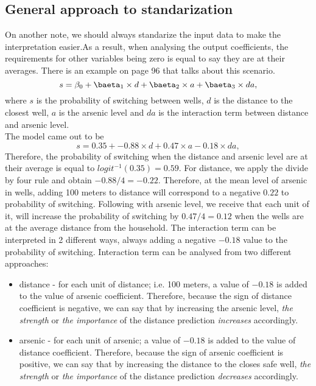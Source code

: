 \documentclass{article}
\begin{document}
\subsection{General approach to standarization}
On another note, we should always standarize the input data to make the interpretation easier.As a result, when analysing the output coefficients, the requirements for other variables being zero is equal to say they are at their averages. There is an example on page 96 that talks about this scenario.
\begin{equation}
s = \beta_0 + \baeta_1 \times d + \baeta_2 \times a + \baeta_3 \times da,
\end{equation}
where $s$ is the probability of switching between wells, $d$ is the distance to the closest well, $a$ is the arsenic level and $da$ is the interaction term between distance and arsenic level.
\\
\indent
The model came out to be
\begin{equation}
s = 0.35 + -0.88 \times d + 0.47 \times a  -0.18 \times da,
\end{equation}
Therefore, the probability of switching when the distance and arsenic level are at their average is equal to $logit^{-1}(0.35) = 0.59$. For distance, we apply the divide by four rule and obtain $-0.88 / 4 = -0.22$. Therefore, at the mean level of arsenic in wells, adding 100 meters to distance will correspond to a negative $0.22$ to probability of switching. Following with arsenic level, we receive that each unit of it, will increase the probability of switching by $0.47 / 4 = 0.12$ when the wells are at the average distance from the household. The interaction term can be interpreted in 2 different ways, always adding a negative $-0.18$ value to the probability of switching. Interaction term can be analysed from two different approaches:
\begin{itemize}
\item distance - for each unit of distance; i.e. 100 meters, a value of $-0.18$ is added to the value of arsenic coefficient. Therefore, because the sign of distance coefficient is negative, we can say that by increasing the arsenic level, \textit{the strength} or \textit{the importance} of the distance prediction \textit{increases} accordingly.
\item arsenic - for each unit of arsenic;  a value of $-0.18$ is added to the value of distance coefficient. Therefore, because the sign of arsenic coefficient is positive, we can say that by increasing the distance to the closes safe well, \textit{the strength} or \textit{the importance} of the distance prediction \textit{decreases} accordingly.
\end{itemize}
\\
\indent
\end{document}
